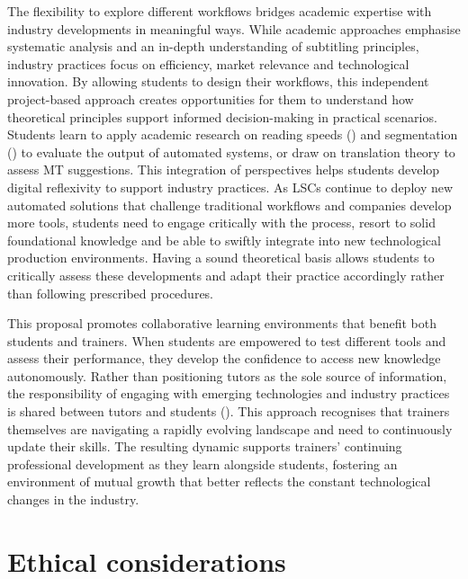 \documentclass[output=paper]{langscibook}
\begin{document}
The flexibility to explore different workflows bridges academic expertise with industry developments in meaningful ways. While academic approaches emphasise systematic analysis and an in-depth understanding of subtitling principles, industry practices focus on efficiency, market relevance and technological innovation. By allowing students to design their workflows, this independent project-based approach creates opportunities for them to understand how theoretical principles support informed decision-making in practical scenarios. Students learn to apply academic research on reading speeds (\citealt{kruger2022subtitle, szarkowska2019six, szarkowska2024impact}) and segmentation (\citealt{gerber-moron2018impact}) to evaluate the output of automated systems, or draw on translation theory to assess MT suggestions. This integration of perspectives helps students develop digital reflexivity \citep[86]{tipton2024routledge} to support industry practices. As LSCs continue to deploy new automated solutions that challenge traditional workflows and companies develop more tools, students need to engage critically with the process, resort to solid foundational knowledge and be able to swiftly integrate into new technological production environments. Having a sound theoretical basis allows students to critically assess these developments and adapt their practice accordingly rather than following prescribed procedures.

This proposal promotes collaborative learning environments that benefit both students and trainers. When students are empowered to test different tools and assess their performance, they develop the confidence to access new knowledge autonomously. Rather than positioning tutors as the sole source of information, the responsibility of engaging with emerging technologies and industry practices is shared between tutors and students (\citealt{kiraly2003instruction, kiraly2006project-based}). This approach recognises that trainers themselves are navigating a rapidly evolving landscape and need to continuously update their skills. The resulting dynamic supports trainers’ continuing professional development as they learn alongside students, fostering an environment of mutual growth that better reflects the constant technological changes in the industry.

\section{Ethical considerations}
\end{document}
